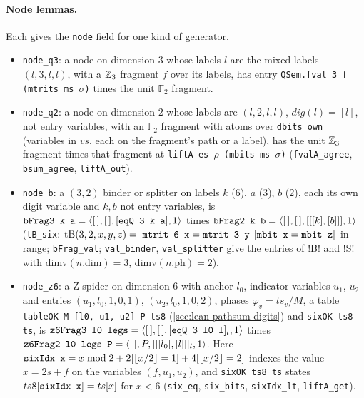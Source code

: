 \paragraph{Node lemmas.} Each gives the \textnormal{\texttt{node}} field for one kind of generator.
\begin{itemize}
\item \textnormal{\texttt{node\_q3}}: a node on dimension $3$ whose labels $l$ are the mixed labels $(l,3,l,l)$, with a
  $\mathbb{Z}_{3}$ fragment $f$ over its labels, has entry \textnormal{\texttt{QSem.fval 3 f (mtrits ms \ensuremath{\sigma})}} times the unit
  $\mathbb F_2$ fragment.
\item \textnormal{\texttt{node\_q2}}: a node on dimension $2$ whose labels are $(l,2,l,l)$, $\mathit{dig}(l)=[l]$, not entry
  variables, with an $\mathbb F_2$ fragment with atoms over \textnormal{\texttt{dbits own}} (variables in $vs$, each
  on the fragment's path or a label), has the unit $\mathbb{Z}_{3}$ fragment times that fragment at
  \textnormal{\texttt{liftA es \ensuremath{\rho} (mbits ms \ensuremath{\sigma})}} (\textnormal{\texttt{fvalA\_agree}}, \textnormal{\texttt{bsum\_agree}}, \textnormal{\texttt{liftA\_out}}).
\item \textnormal{\texttt{node\_b}}: a $(3,2)$ binder or splitter on labels $k$ ($6$), $a$ ($3$), $b$ ($2$), each its own
  digit variable and $k,b$ not entry variables, is
  $\textnormal{\texttt{bFrag3 k a}}=\langle[\,],[\,],[\textnormal{\texttt{eqQ 3 k a}}],1\rangle$ times
  $\textnormal{\texttt{bFrag2 k b}}=\langle[\,],[\,],[[[k],[b]]],1\rangle$ (\textnormal{\texttt{tB\_six}}:
  $\mathrm{tB}(3,2,x,y,z) = [\textnormal{\texttt{mtrit 6 x}}=\textnormal{\texttt{mtrit 3 y}}]\,[\textnormal{\texttt{mbit x}}=\textnormal{\texttt{mbit z}}]$ in range;
  \textnormal{\texttt{bFrag\_val}}; \textnormal{\texttt{val\_binder}}, \textnormal{\texttt{val\_splitter}} give the entries of \lean!B! and \lean!S! with
  $\mathrm{dimv}(n.\mathrm{dim})=3$, $\mathrm{dimv}(n.\mathrm{ph})=2$).
\item \textnormal{\texttt{node\_z6}}: a Z spider on dimension $6$ with anchor $l_0$, indicator variables $u_1$, $u_2$ and
  entries $(u_1,l_0,1,0,1)$, $(u_2,l_0,1,0,2)$, phases $\varphi_v = ts_v/M$, a table
  \textnormal{\texttt{tableOK M [l0, u1, u2] P ts8}} (\cref{sec:lean-pathsum-digits}) and
  \textnormal{\texttt{sixOK ts8 ts}}, is $\textnormal{\texttt{z6Frag3 l0 legs}}=\langle[\,],[\,],[\textnormal{\texttt{eqQ 3 l0 l}}]_l,1\rangle$ times
  $\textnormal{\texttt{z6Frag2 l0 legs P}}=\langle[\,],P,[[[l_0],[l]]]_l,1\rangle$. Here
  $\textnormal{\texttt{sixIdx x}} = x\bmod2+2[\lfloor x/2\rfloor=1]+4[\lfloor x/2\rfloor=2]$ indexes the value $x=2s+f$ on the
  variables $(f,u_1,u_2)$, and \textnormal{\texttt{sixOK ts8 ts}} states $ts8[\textnormal{\texttt{sixIdx x}}]=ts[x]$ for
  $x<6$ (\textnormal{\texttt{six\_eq}}, \textnormal{\texttt{six\_bits}}, \textnormal{\texttt{sixIdx\_lt}}, \textnormal{\texttt{liftA\_get}}).
\end{itemize}

